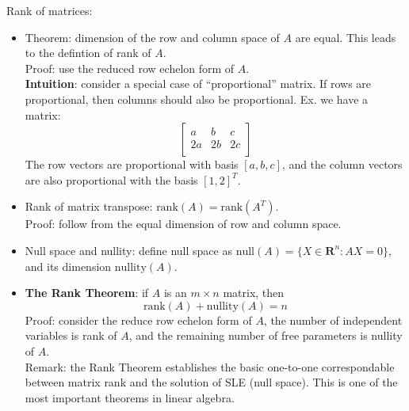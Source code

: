\documentclass{report}
\begin{document}
Rank of matrices: 
\begin{itemize}
\item Theorem: dimension of the row and column space of $A$ are equal. This leads to the defintion of rank of $A$. \\
Proof: use the reduced row echelon form of $A$. \\
\textbf{Intuition}: consider a special case of ``proportional'' matrix. If rows are proportional, then columns should also be proportional. Ex. we have a matrix: 
\begin{equation}
\left[
\begin{array}{lll}
a & b & c\\
2a & 2b & 2c\\
\end{array}
\right]
\end{equation}
The row vectors are proportional with basis $[a, b, c]$, and the column vectors are also proportional with the basis $[1,2]^T$. 

\item Rank of matrix transpose: $\text{rank}(A) = \text{rank}(A^T)$.\\
Proof: follow from the equal dimension of row and column space.  

\item Null space and nullity: define null space as $\text{null}(A) = \{X \in \textbf{R}^n: AX = 0\}$, and its dimension $\text{nullity}(A)$. 

\item \textbf{The Rank Theorem}: if $A$ is an $m \times n$ matrix, then 
\begin{equation}
\text{rank}(A) + \text{nullity}(A) = n	
\end{equation}
Proof: consider the reduce row echelon form of $A$, the number of independent variables is rank of $A$, and the remaining number of free parameters is nullity of $A$. \\
Remark: the Rank Theorem establishes the basic one-to-one correspondable between matrix rank and the solution of SLE (null space). This is one of the most important theorems in linear algebra. 


\end{itemize}
\end{document}
